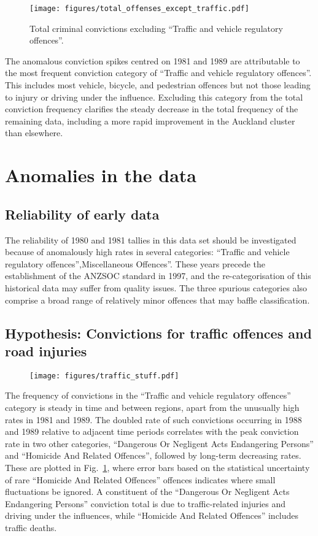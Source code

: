 \documentclass[onecolumn]{mysimple}
\begin{document}
\begin{figure}
  \centering
  \texttt{[image: figures/total\_offenses\_except\_traffic.pdf]}
  \caption{Total criminal convictions excluding ``Traffic and vehicle regulatory offences''.}
  \label{fig:total crime}
\end{figure}

The anomalous conviction spikes centred on 1981 and 1989 are attributable to the most frequent conviction category of ``Traffic and vehicle regulatory offences''.
This includes most vehicle, bicycle, and pedestrian offences but not those leading to injury or driving under the influence.
Excluding this category from the total conviction frequency clarifies the steady decrease in the total frequency of the remaining data, including a more rapid improvement in the Auckland cluster than elsewhere. 

\section*{Anomalies in the data}

\subsection*{Reliability of early data}

The reliability of 1980 and 1981 tallies in this data set should be investigated because of anomalously high rates in several categories: ``Traffic and vehicle regulatory offences'',Miscellaneous Offences''.
These years precede the establishment of the ANZSOC standard in 1997, and the re-categorisation of this historical data may suffer from quality issues. 
The three spurious categories also comprise a broad range of relatively minor offences that may baffle classification.

\subsection*{Hypothesis: Convictions for traffic offences and road injuries}

\begin{figure}
  \centering
  \texttt{[image: figures/traffic\_stuff.pdf]}
  \caption{}
  \label{fig:traffic stuff}
\end{figure}


The frequency of convictions in the ``Traffic and vehicle regulatory offences'' category is steady in time and between regions, apart from the unusually high rates in 1981 and 1989. 
The doubled rate of such convictions occurring in 1988 and 1989 relative to adjacent time periods correlates with the peak conviction rate in two other categories, ``Dangerous Or Negligent Acts Endangering Persons'' and ``Homicide And Related Offences'', followed by long-term decreasing rates.
These are plotted in Fig.~\ref{fig:total crime}, where error bars based on the statistical uncertainty of rare ``Homicide And Related Offences'' offences indicates where small fluctuations be ignored.
A constituent of the ``Dangerous Or Negligent Acts Endangering Persons'' conviction total is due to traffic-related injuries and driving under the influences, while ``Homicide And Related Offences'' includes traffic deaths.  
\end{document}
